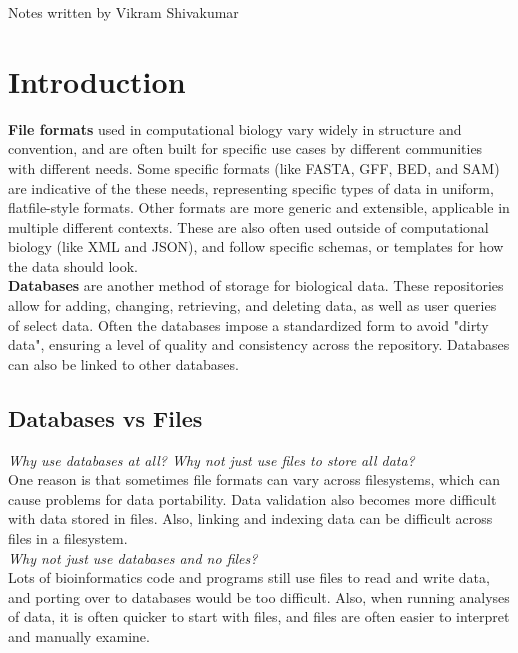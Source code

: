 \documentclass[12pt]{article}
\begin{document}
\thispagestyle{plain}
   \newpage
   \setcounter{page}{1}
   \noindent
   \begin{center}
   \end{center}
   {Notes written by Vikram Shivakumar}
   \vspace*{4mm}


\section{Introduction}

{\bf File formats} used in computational biology vary widely in structure and convention, and are often built for specific use cases by different communities with different needs. Some specific formats (like FASTA, GFF, BED, and SAM) are indicative of the these needs, representing specific types of data in uniform, flatfile-style formats. Other formats are more generic and extensible, applicable in multiple different contexts. These are also often used outside of computational biology (like XML and JSON), and follow specific schemas, or templates for how the data should look. \\[10pt]
{\bf Databases} are another method of storage for biological data. These repositories allow for adding, changing, retrieving, and deleting data, as well as user queries of select data. Often the databases impose a standardized form to avoid "dirty data", ensuring a level of quality and consistency across the repository. Databases can also be linked to other databases.

\subsection{Databases vs Files}

\textit{Why use databases at all? Why not just use files to store all data?}\\ One reason is that sometimes file formats can vary across filesystems, which can cause problems for data portability. Data validation also becomes more difficult with data stored in files. Also, linking and indexing data can be difficult across files in a filesystem.\\
\textit{Why not just use databases and no files?}\\
Lots of bioinformatics code and programs still use files to read and write data, and porting over to databases would be too difficult. Also, when running analyses of data, it is often quicker to start with files, and files are often easier to interpret and manually examine. 
\end{document}
